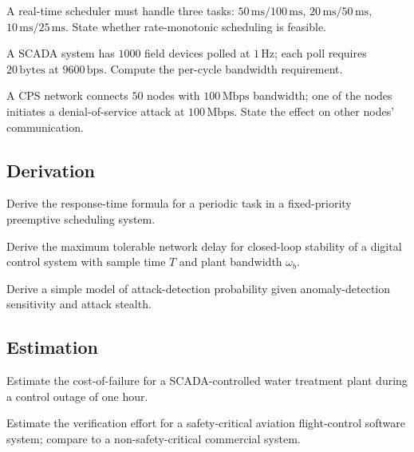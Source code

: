\begin{exercise}
A real-time scheduler must handle three tasks: $50\,\text{ms}/100\,\text{ms}$, $20\,\text{ms}/50\,\text{ms}$, $10\,\text{ms}/25\,\text{ms}$. State whether rate-monotonic scheduling is feasible.
\end{exercise}

\begin{exercise}
A SCADA system has $1000$ field devices polled at $1\,\text{Hz}$; each poll requires $20\,\text{bytes}$ at $9600\,\text{bps}$. Compute the per-cycle bandwidth requirement.
\end{exercise}

\begin{exercise}
A CPS network connects $50$ nodes with $100\,\text{Mbps}$ bandwidth; one of the nodes initiates a denial-of-service attack at $100\,\text{Mbps}$. State the effect on other nodes' communication.
\end{exercise}

\subsection*{Derivation}

\begin{exercise}
Derive the response-time formula for a periodic task in a fixed-priority preemptive scheduling system.
\end{exercise}

\begin{exercise}
Derive the maximum tolerable network delay for closed-loop stability of a digital control system with sample time $T$ and plant bandwidth $\omega_b$.
\end{exercise}

\begin{exercise}
Derive a simple model of attack-detection probability given anomaly-detection sensitivity and attack stealth.
\end{exercise}

\subsection*{Estimation}

\begin{exercise}
Estimate the cost-of-failure for a SCADA-controlled water treatment plant during a control outage of one hour.
\end{exercise}

\begin{exercise}
Estimate the verification effort for a safety-critical aviation flight-control software system; compare to a non-safety-critical commercial system.
\end{exercise}

